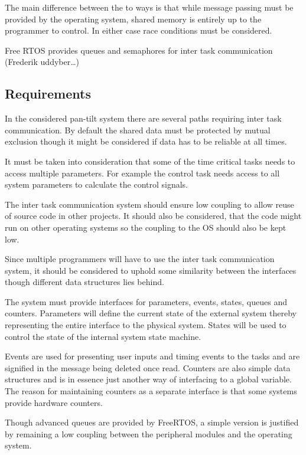 The main difference between the to ways is that while message passing must be
provided by the operating system, shared memory is entirely up to the programmer
to control. In either case race conditions must be considered.

Free RTOS provides queues and semaphores for inter task communication (Frederik
uddyber\ldots)

\subsection{Requirements}
In the considered pan-tilt system there are several paths requiring inter task
communication. By default the shared data must be protected by mutual exclusion
though it might be considered if data has to be reliable at all times. 

 It must be taken into consideration that some of the time critical tasks needs
 to access multiple parameters. For example the control task needs access to all
 system parameters to calculate the control signals.
 
 The inter task communication system should ensure low coupling to allow reuse
 of source code in other projects. It should also be considered, that the code
 might run on other operating systems so the coupling to the OS should also be kept
 low.
 
 Since multiple programmers will have to use the inter task communication
 system, it should be considered to uphold some similarity between the
 interfaces though different data structures lies behind.
 
 The system must provide interfaces for parameters, events, states, queues
and counters. Parameters will define the current state of the external system
thereby representing the entire interface to the physical system. States will be
used to control the state of the internal system state machine.

Events are used for presenting user inputs and timing events to the tasks and
are signified in the message being deleted once read. Counters are also simple
data structures and is in essence just another way of interfacing to a global
variable. The reason for maintaining counters as a separate interface is that
some systems provide hardware counters.

Though advanced queues are provided by FreeRTOS, a simple version is justified by
remaining a low coupling between the peripheral modules and the operating
system.

